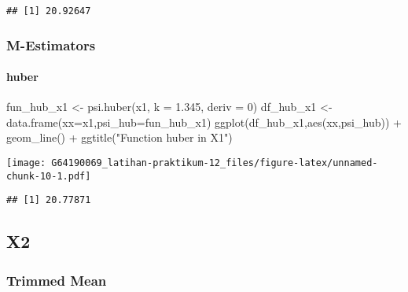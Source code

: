 \documentclass[
]{article}
\newenvironment{Shaded}{\begin{snugshade}}{\end{snugshade}}
\newcommand{\AttributeTok}[1]{\textcolor[rgb]{0.77,0.63,0.00}{#1}}
\newcommand{\DecValTok}[1]{\textcolor[rgb]{0.00,0.00,0.81}{#1}}
\newcommand{\FloatTok}[1]{\textcolor[rgb]{0.00,0.00,0.81}{#1}}
\newcommand{\FunctionTok}[1]{\textcolor[rgb]{0.00,0.00,0.00}{#1}}
\newcommand{\NormalTok}[1]{#1}
\newcommand{\OtherTok}[1]{\textcolor[rgb]{0.56,0.35,0.01}{#1}}
\newcommand{\SpecialCharTok}[1]{\textcolor[rgb]{0.00,0.00,0.00}{#1}}
\newcommand{\StringTok}[1]{\textcolor[rgb]{0.31,0.60,0.02}{#1}}
\begin{document}
\begin{verbatim}
## [1] 20.92647
\end{verbatim}

\hypertarget{m-estimators}{%
\subsubsection{M-Estimators}\label{m-estimators}}

\hypertarget{huber}{%
\paragraph{huber}\label{huber}}

\begin{Shaded}
\begin{Highlighting}[]
\NormalTok{fun\_hub\_x1 }\OtherTok{\textless{}{-}} \FunctionTok{psi.huber}\NormalTok{(x1, }\AttributeTok{k =} \FloatTok{1.345}\NormalTok{, }\AttributeTok{deriv =} \DecValTok{0}\NormalTok{)}
\NormalTok{df\_hub\_x1 }\OtherTok{\textless{}{-}} \FunctionTok{data.frame}\NormalTok{(}\AttributeTok{xx=}\NormalTok{x1,}\AttributeTok{psi\_hub=}\NormalTok{fun\_hub\_x1)}
\FunctionTok{ggplot}\NormalTok{(df\_hub\_x1,}\FunctionTok{aes}\NormalTok{(xx,psi\_hub)) }\SpecialCharTok{+} 
  \FunctionTok{geom\_line}\NormalTok{() }\SpecialCharTok{+} \FunctionTok{ggtitle}\NormalTok{(}\StringTok{"Function huber in X1"}\NormalTok{)}
\end{Highlighting}
\end{Shaded}

\texttt{[image: G64190069\_latihan-praktikum-12\_files/figure-latex/unnamed-chunk-10-1.pdf]}

\begin{Shaded}
\end{Shaded}

\begin{verbatim}
## [1] 20.77871
\end{verbatim}

\hypertarget{x2-1}{%
\subsection{X2}\label{x2-1}}

\hypertarget{trimmed-mean-1}{%
\subsubsection{Trimmed Mean}\label{trimmed-mean-1}}
\end{document}
